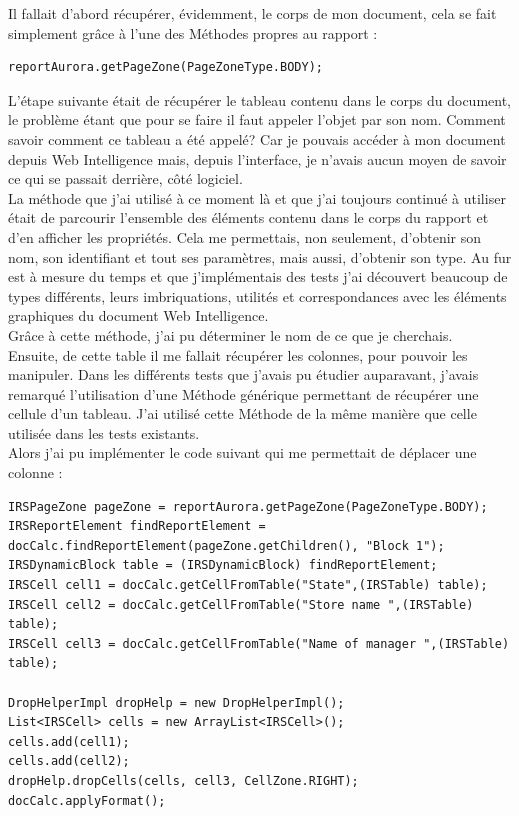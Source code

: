 Il fallait d'abord r\'{e}cup\'{e}rer, \'{e}videmment, le corps de mon document, cela se fait simplement gr\^{a}ce \`{a} l'une des M\'{e}thodes propres au rapport :
\begin{lstlisting}
reportAurora.getPageZone(PageZoneType.BODY);
\end{lstlisting}
L'\'{e}tape suivante \'{e}tait de r\'{e}cup\'{e}rer le tableau contenu dans le corps du document, le probl\`{e}me \'{e}tant que pour se faire il faut appeler l'objet par son nom. Comment savoir comment ce tableau a \'{e}t\'{e} appel\'{e}? Car je pouvais acc\'{e}der \`{a} mon document depuis Web Intelligence mais, depuis l'interface, je n'avais aucun moyen de savoir ce qui se passait derri\`{e}re, c\^{o}t\'{e} logiciel.\\
La m\'{e}thode que j'ai utilis\'{e} \`{a} ce moment l\`{a} et que j'ai toujours continu\'{e} \`{a} utiliser \'{e}tait de parcourir l'ensemble des \'{e}l\'{e}ments contenu dans le corps du rapport et d'en afficher les propri\'{e}t\'{e}s. Cela me permettais, non seulement, d'obtenir son nom, son identifiant et tout ses param\`{e}tres, mais aussi, d'obtenir son type. Au fur est \`{a} mesure du temps et que j'impl\'{e}mentais des tests j'ai d\'{e}couvert beaucoup de types diff\'{e}rents, leurs imbriquations, utilit\'{e}s et correspondances avec les \'{e}l\'{e}ments graphiques du document Web Intelligence.\\
Gr\^{a}ce \`{a} cette m\'{e}thode, j'ai pu d\'{e}terminer le nom de ce que je cherchais.\\
Ensuite, de cette table il me fallait r\'{e}cup\'{e}rer les colonnes, pour pouvoir les manipuler. Dans les diff\'{e}rents tests que j'avais pu \'{e}tudier auparavant, j'avais remarqu\'{e} l'utilisation d'une M\'{e}thode g\'{e}n\'{e}rique permettant de r\'{e}cup\'{e}rer une cellule d'un tableau. J'ai utilis\'{e} cette M\'{e}thode de la m\^{e}me mani\`{e}re que celle utilis\'{e}e dans les tests existants. \\
Alors j'ai pu impl\'{e}menter le code suivant qui me permettait de d\'{e}placer une colonne :


\begin{lstlisting}
IRSPageZone pageZone = reportAurora.getPageZone(PageZoneType.BODY);
IRSReportElement findReportElement = docCalc.findReportElement(pageZone.getChildren(), "Block 1");
IRSDynamicBlock table = (IRSDynamicBlock) findReportElement;
IRSCell cell1 = docCalc.getCellFromTable("State",(IRSTable) table);
IRSCell cell2 = docCalc.getCellFromTable("Store name ",(IRSTable) table);
IRSCell cell3 = docCalc.getCellFromTable("Name of manager ",(IRSTable) table);

DropHelperImpl dropHelp = new DropHelperImpl();
List<IRSCell> cells = new ArrayList<IRSCell>();
cells.add(cell1);
cells.add(cell2);
dropHelp.dropCells(cells, cell3, CellZone.RIGHT);
docCalc.applyFormat();
\end{lstlisting}

